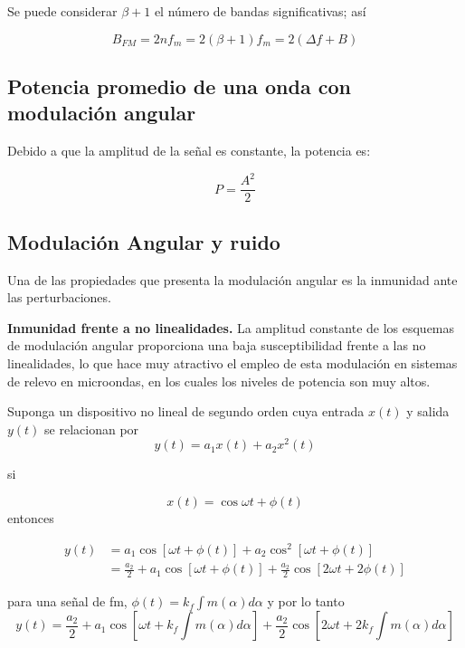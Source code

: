 \documentclass[12pt,letterpaper,titlepage,twoside]{book}
\begin{document}
Se puede considerar $\beta + 1 $ el número de bandas significativas; así

\begin{equation}
B_{FM} = 2nf_m = 2 (\beta +1) f_m = 2 (\Delta f + B)
\end{equation}

\subsection{Potencia promedio de una onda con modulación angular}
Debido a que la amplitud de la señal es constante, la potencia es:

\begin{equation}
P = \frac{A^2}{2}
\end{equation}

\subsection{Modulación Angular y ruido}
Una de las propiedades que presenta la modulación angular es la inmunidad ante las perturbaciones. 

\textbf{Inmunidad frente a no linealidades.} La amplitud constante de los esquemas de modulación angular proporciona una baja susceptibilidad frente a las no linealidades, lo que hace muy atractivo el empleo de esta modulación en sistemas de relevo en microondas, en los cuales los niveles de potencia son muy altos.

Suponga un dispositivo no lineal de segundo orden cuya entrada $x(t)$ y salida $y(t)$ se relacionan por
\begin{equation}
y(t) = a_1x(t) + a_2 x^2(t)
\end{equation}

si 

\begin{equation}
x(t) = \cos \omega t + \phi(t)
\end{equation}
entonces

\begin{align}
y(t) &= a_1 \cos\left[ \omega t + \phi(t) \right] + a_2 \cos^2 \left[ \omega t + \phi(t) \right]\\
&= \frac{a_2}{2} + a_1 \cos\left[ \omega t + \phi(t) \right] + \frac{a_2}{2} \cos\left[ 2 \omega t + 2 \phi(t) \right] 
\end{align}

para una señal de fm, $\phi(t) = k_f \int m(\alpha) d \alpha $ y por lo tanto 
\begin{equation}
y(t) = \frac{a_2}{2} + a_1 \cos\left[ \omega t + k_f \int m(\alpha) d \alpha  \right] + \frac{a_2}{2} \cos\left[ 2 \omega t + 2 k_f \int m(\alpha) d \alpha  \right]
\end{equation}
\end{document}
